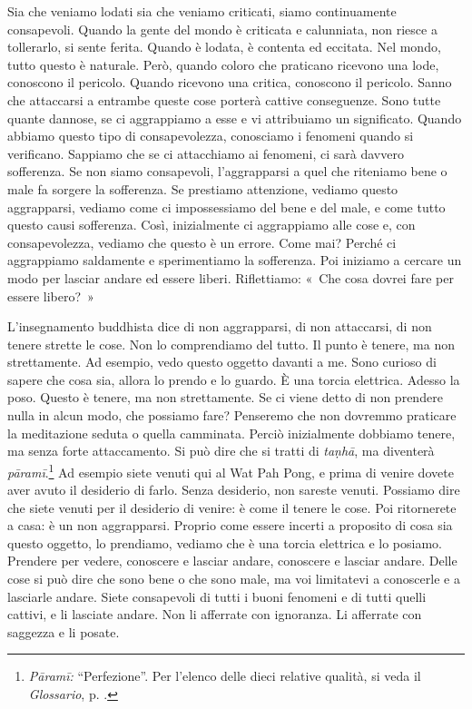 Sia che veniamo lodati sia che veniamo criticati, siamo continuamente
consapevoli. Quando la gente del mondo è criticata e calunniata, non
riesce a tollerarlo, si sente ferita. Quando è lodata, è contenta ed
eccitata. Nel mondo, tutto questo è naturale. Però, quando coloro che
praticano ricevono una lode, conoscono il pericolo. Quando ricevono una
critica, conoscono il pericolo. Sanno che attaccarsi a entrambe queste
cose porterà cattive conseguenze. Sono tutte quante dannose, se ci
aggrappiamo a esse e vi attribuiamo un significato. Quando abbiamo
questo tipo di consapevolezza, conosciamo i fenomeni quando si
verificano. Sappiamo che se ci attacchiamo ai fenomeni, ci sarà davvero
sofferenza. Se non siamo consapevoli, l'aggrapparsi a quel che
riteniamo bene o male fa sorgere la sofferenza. Se prestiamo attenzione,
vediamo questo aggrapparsi, vediamo come ci impossessiamo del bene e del
male, e come tutto questo causi sofferenza. Così, inizialmente ci
aggrappiamo alle cose e, con consapevolezza, vediamo che questo è un
errore. Come mai? Perché ci aggrappiamo saldamente e sperimentiamo la
sofferenza. Poi iniziamo a cercare un modo per lasciar andare ed essere
liberi. Riflettiamo: «~Che cosa dovrei fare per essere libero?~»

L'insegnamento buddhista dice di non aggrapparsi, di non attaccarsi, di
non tenere strette le cose. Non lo comprendiamo del tutto. Il punto è
tenere, ma non strettamente. Ad esempio, vedo questo oggetto davanti a
me. Sono curioso di sapere che cosa sia, allora lo prendo e lo guardo. È
una torcia elettrica. Adesso la poso. Questo è tenere, ma non
strettamente. Se ci viene detto di non prendere nulla in alcun modo, che
possiamo fare? Penseremo che non dovremmo praticare la meditazione
seduta o quella camminata. Perciò inizialmente dobbiamo tenere, ma
senza forte attaccamento. Si può dire che si tratti di \emph{taṇhā}, ma
diventerà \emph{pāramī}.\footnote{\emph{Pāramī:} ``Perfezione''. Per
  l'elenco delle dieci relative qualità, si veda il \emph{Glossario}, p. \pageref{glossary-parami}.}
Ad esempio siete venuti qui al Wat Pah Pong, e prima di venire dovete
aver avuto il desiderio di farlo. Senza desiderio, non sareste venuti.
Possiamo dire che siete venuti per il desiderio di venire: è come il
tenere le cose. Poi ritornerete a casa: è un non aggrapparsi. Proprio
come essere incerti a proposito di cosa sia questo oggetto, lo
prendiamo, vediamo che è una torcia elettrica e lo posiamo. Prendere per
vedere, conoscere e lasciar andare, conoscere e lasciar andare. Delle
cose si può dire che sono bene o che sono male, ma voi limitatevi a
conoscerle e a lasciarle andare. Siete consapevoli di tutti i buoni
fenomeni e di tutti quelli cattivi, e li lasciate andare. Non li
afferrate con ignoranza. Li afferrate con saggezza e li posate.


